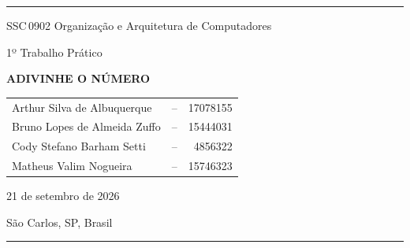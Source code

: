 \begin{center}
	\rule{0.95\textwidth}{1pt}


	{\sffamily SSC\,0902 Organização e Arquitetura de Computadores}

	\vspace*{.5\baselineskip}

	{\sffamily 1º Trabalho Prático}

	\vspace*{1.25\baselineskip}

	{\sffamily\bfseries\large\MakeUppercase{Adivinhe o Número}}
	
	\vspace*{1.5\baselineskip}

	\begin{tabular}{lcr}
		Arthur Silva de Albuquerque  & -- & 17078155 \\
		Bruno Lopes de Almeida Zuffo & -- & 15444031 \\
		Cody Stefano Barham Setti    & -- & 4856322  \\
		Matheus Valim Nogueira       & -- & 15746323
	\end{tabular}

	\vspace*{1.5\baselineskip}
	
	{\normalsize 21 de setembro de 2026}

	\vspace*{.5\baselineskip}

	{\normalsize São Carlos, SP, Brasil}


	\rule{0.95\textwidth}{1pt}
\end{center}